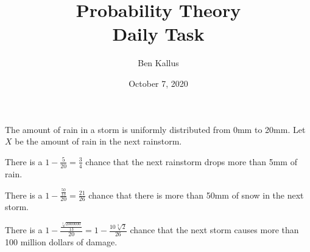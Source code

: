 \documentclass[12pt]{article}
\title{Probability Theory \\ Daily Task}
\author{Ben Kallus}
\date{October 7, 2020}
\begin{document}
\maketitle

The amount of rain in a storm is uniformly distributed from 0mm to 20mm. Let $X$ be the amount of rain in the next rainstorm.

 There is a $1 - \frac5{20} = \frac34$ chance that the next rainstorm drops more than 5mm of rain.

 There is a $1 - \frac{\frac{50}{13}}{20} = \frac{21}{26}$ chance that there is more than 50mm of snow in the next storm.

 There is a $1-\frac{\frac{\sqrt[3]{2000000}}{13}}{20} = 1-\frac{10\sqrt[3]{2}}{26}$ chance that the next storm causes more than 100 million dollars of damage.
\end{document}

